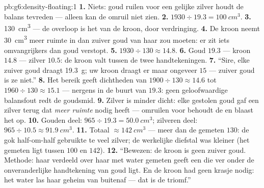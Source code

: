 \begin{solution}{pb:g6:density-floating:1}
\textbf{1.} Niets: goud ruilen voor een gelijke \emph{} zilver
houdt de balans tevreden ---  alleen kan de omruil niet zien.
\textbf{2.} $1930 \div 19.3 = \qty{100}{cm^3}$.
\textbf{3.} \qty{130}{cm^3} --- de overloop is het  van de
kroon, door verdringing.
\textbf{4.} De kroon neemt \qty{30}{cm^3} meer ruimte in dan zuiver
goud van haar  zou moeten: er zit iets omvangrijkers dan goud
verstopt.
\textbf{5.} $1930 \div 130 \approx 14.8$.
\textbf{6.} Goud $19.3$ --- kroon $14.8$ --- zilver $10.5$: de kroon
valt tussen de twee handtekeningen.
\textbf{7.} ``Sire, elke  zuiver goud draagt
\qty{19.3}{g}; uw kroon draagt er maar ongeveer $15$ --- zuiver goud
is ze niet.''
\textbf{8.} Het bereik geeft dichtheden van
$1900 \div 130 \approx 14.6$ tot $1960 \div 130 \approx 15.1$ ---
nergens in de buurt van $19.3$: geen geloofwaardige balansfout redt de
goudsmid.
\textbf{9.} Zilver is minder dicht: elke gestolen  goud gaf een
 zilver terug dat \emph{meer ruimte} nodig heeft --- omruilen
 voor  behoudt de  en blaast het  op.
\textbf{10.} Gouden deel: $965 \div 19.3 = \qty{50.0}{cm^3}$;
zilveren deel: $965 \div 10.5 \approx \qty{91.9}{cm^3}$.
\textbf{11.} Totaal $\approx \qty{142}{cm^3}$ --- meer dan de gemeten
$130$: de gok half-om-half gebruikte te veel zilver; de werkelijke
diefstal was kleiner (het gemeten  ligt tussen $100$ en $142$).
\textbf{12.} ``Bewezen: de kroon is geen zuiver goud. Methode: haar
 verdeeld over haar met water gemeten  geeft een
 die ver onder de onveranderlijke handtekening van goud
ligt. En de kroon had geen krasje nodig: het water las haar geheim van
buitenaf --- dat is de triomf.''
\end{solution}
